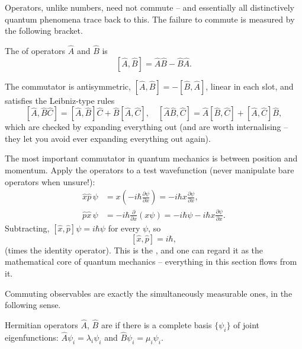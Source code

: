Operators, unlike numbers, need not commute -- and essentially all distinctively quantum phenomena trace back to this. The failure to commute is measured by the following bracket.

\begin{definition}[Commutator]
    The  of operators $\hat{A}$ and $\hat{B}$ is
    $$
    [\hat{A}, \hat{B}] = \hat{A}\hat{B} - \hat{B}\hat{A}.
    $$
\end{definition}

The commutator is antisymmetric, $[\hat{A}, \hat{B}] = -[\hat{B}, \hat{A}]$, linear in each slot, and satisfies the Leibniz-type rules
$$
[\hat{A}, \hat{B}\hat{C}] = [\hat{A}, \hat{B}]\hat{C} + \hat{B}[\hat{A}, \hat{C}], \quad
[\hat{A}\hat{B}, \hat{C}] = \hat{A}[\hat{B}, \hat{C}] + [\hat{A}, \hat{C}]\hat{B},
$$
which are checked by expanding everything out (and are worth internalising -- they let you avoid ever expanding everything out again).

\begin{example}
    The most important commutator in quantum mechanics is between position and momentum. Apply the operators to a test wavefunction (never manipulate bare operators when unsure!):
    \begin{align*}
        \hat{x}\hat{p} \, \psi &= x \left( -i\hbar \frac{\partial \psi}{\partial x} \right) = -i\hbar x \frac{\partial \psi}{\partial x}, \\
        \hat{p}\hat{x} \, \psi &= -i\hbar \frac{\partial}{\partial x}(x \psi) = -i \hbar \psi - i \hbar x \frac{\partial \psi}{\partial x}.
    \end{align*}
    Subtracting, $[\hat{x}, \hat{p}]\psi = i\hbar\psi$ for every $\psi$, so
    $$
    [\hat{x}, \hat{p}] = i \hbar,
    $$
    (times the identity operator). This is the , and one can regard it as the mathematical core of quantum mechanics -- everything in this section flows from it.
\end{example}

Commuting observables are exactly the simultaneously measurable ones, in the following sense.

\begin{definition}
    Hermitian operators $\hat{A}$, $\hat{B}$ are  if there is a complete basis $\{\psi_i\}$ of joint eigenfunctions: $\hat{A}\psi_i = \lambda_i \psi_i$ and $\hat{B} \psi_i = \mu_i \psi_i$.
\end{definition}

